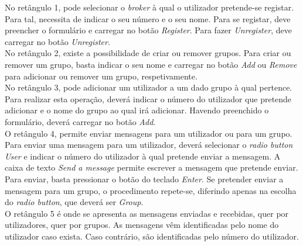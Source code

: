 No retângulo 1, pode selecionar o \textit{broker} à qual o utilizador pretende-se registar. Para tal, necessita de indicar o seu número e o seu nome. Para se registar, deve preencher o formulário e carregar no botão \textit{Register}. Para fazer \textit{Unregister}, deve carregar no botão \textit{Unregister}.\\

No retângulo 2, existe a possibilidade de criar ou remover grupos. Para criar ou remover um grupo, basta indicar o seu nome e carregar no botão \textit{Add} ou \textit{Remove} para adicionar ou remover um grupo, respetivamente.\\

No retângulo 3, pode adicionar um utilizador a um dado grupo à qual pertence. Para realizar esta operação, deverá indicar o número do utilizador que pretende adicionar e o nome do grupo ao qual irá adicionar. Havendo preenchido o formulário, deverá carregar no botão \textit{Add}.\\

O retângulo 4, permite enviar mensagens para um utilizador ou para um grupo. Para enviar uma mensagem para um utilizador, deverá selecionar o \textit{radio button User} e indicar o número do utilizador à qual pretende enviar a mensagem. A caixa de texto \textit{Send a message} permite escrever a mensagem que pretende enviar. Para enviar, basta pressionar o botão do teclado \textit{Enter}. Se pretender enviar a mensagem para um grupo, o procedimento repete-se, diferindo apenas na escolha do \textit{radio button}, que deverá ser \textit{Group}.\\

O retângulo 5 é onde se apresenta as mensagens enviadas e recebidas, quer por utilizadores, quer por grupos. As mensagens vêm identificadas pelo nome do utilizador caso exista. Caso contrário, são identificadas pelo número do utilizador. 